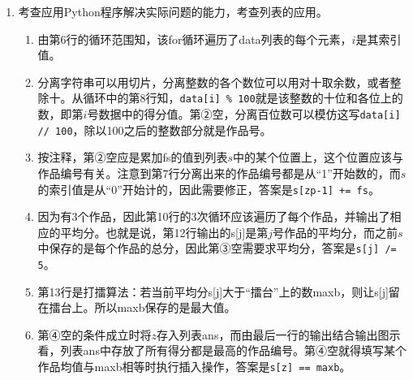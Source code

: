 \begin{enumerate}
\item 考查应用Python程序解决实际问题的能力，考查列表的应用。
	\begin{enumerate}[label=$(\alph*)$]
\setcounter{qnumber}{1}
\begin{lstlisting}[numbers=left]
import random as rd
data = [180,283,385,170,276,384,180,285,380,190,295,390,170,272,372]
s = [0, 0, 0]                   # 存储3个作品的得分
ans = []                        # 存储并列最高平均分的作品号
maxb = 0
for i in range(len(data)):
    zp = `\clozeblank{2}`   # 分离出作品编号
    fs = data[i] % 100
    `\clozeblank{2}`        # 累加当前作品的得分
for j in range(3):
    `\clozeblank{2}`
    print("作品", j+1, "平均分为", s[j])
    if s[j] > maxb:
        maxb = s[j]
for z in range(3):              # 查找并列最高平均分
    if `\clozeblank{2}`:
        ans.append(z + 1)       # 将数据添加到列表ans尾部
print("平均分最高作品号是: ", ans)
\end{lstlisting}
	\item 由第6行的循环范围知，该for循环遍历了data列表的每个元素，$i$是其索引值。
	\item 分离字符串可以用切片，分离整数的各个数位可以用对十取余数，或者整除十。从循环中的第8行知，\lstinline|data[i] % 100|就是该整数的十位和各位上的数，即第$i$号数据中的得分值。第②空，分离百位数可以模仿这写\lstinline|data[i] // 100|，除以100之后的整数部分就是作品号。
	\item 按注释，第②空应是累加fs的值到列表$s$中的某个位置上，这个位置应该与作品编号有关。注意到第7行分离出来的作品编号都是从“1”开始数的，而$s$的索引值是从“0”开始计的，因此需要修正，答案是\lstinline|s[zp-1] += fs|。
	\item 因为有3个作品，因此第10行的3次循环应该遍历了每个作品，并输出了相应的平均分。也就是说，第12行输出的s[j]是第$j$号作品的平均分，而之前$s$中保存的是每个作品的总分，因此第③空需要求平均分，答案是\lstinline|s[j] /= 5|。
	\item 第13行是打擂算法：若当前平均分s[j]大于“擂台”上的数maxb，则让s[j]留在擂台上。所以maxb保存的是最大值。
	\item 第④空的条件成立时将$z$存入列表ans，而由最后一行的输出结合输出图示看，列表ans中存放了所有得分都是最高的作品编号。第④空就得填写某个作品均值与maxb相等时执行插入操作，答案是\lstinline|s[z] == maxb|。
	\end{enumerate}






































\end{enumerate}



